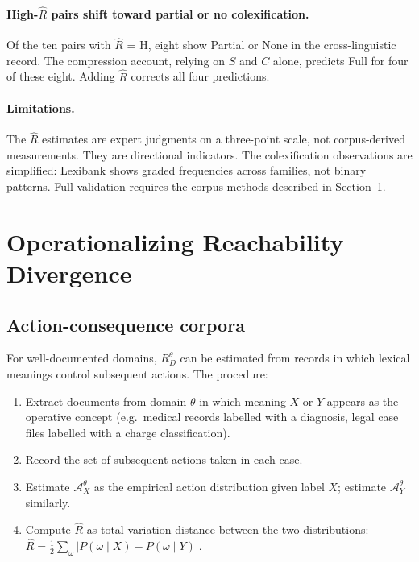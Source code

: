 \documentclass[12pt]{article}
\theoremstyle{rthm}
\theoremstyle{rdef}
\theoremstyle{remark}
\newcommand{\A}{\mathcal{A}}
\newcommand{\RD}[1][\theta]{R_{D}^{#1}}
\begin{document}
\paragraph{High-$\widehat{R}$ pairs shift toward partial or no colexification.}
Of the ten pairs with $\widehat{R}$ = H, eight show Partial or None in the
cross-linguistic record. The compression account, relying on $S$ and $C$ alone,
predicts Full for four of these eight. Adding $\widehat{R}$ corrects all four
predictions.

\paragraph{Limitations.}
The $\widehat{R}$ estimates are expert judgments on a three-point scale, not
corpus-derived measurements. They are directional indicators. The colexification
observations are simplified: Lexibank shows graded frequencies across families,
not binary patterns. Full validation requires the corpus methods described in
Section~\ref{sec:operationalization}.

\section{Operationalizing Reachability Divergence}
\label{sec:operationalization}

\subsection{Action-consequence corpora}

For well-documented domains, $\RD$ can be estimated from records in which
lexical meanings control subsequent actions. The procedure:

\begin{enumerate}[nosep]
  \item Extract documents from domain $\theta$ in which meaning $X$ or $Y$
        appears as the operative concept (e.g.\ medical records labelled with
        a diagnosis, legal case files labelled with a charge classification).
  \item Record the set of subsequent actions taken in each case.
  \item Estimate $\A_X^{\theta}$ as the empirical action distribution given
        label $X$; estimate $\A_Y^{\theta}$ similarly.
  \item Compute $\widehat{R}$ as total variation distance between the two
        distributions:
        $\widehat{R} = \frac{1}{2}\sum_{\omega} |P(\omega \mid X) - P(\omega
        \mid Y)|$.
\end{enumerate}
\end{document}
